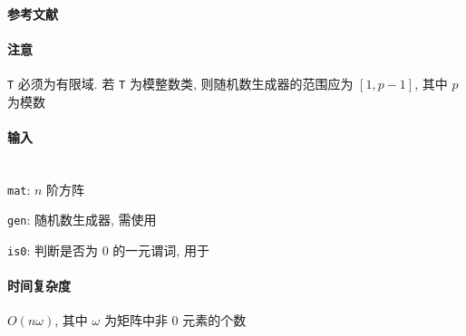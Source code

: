 \paragraph{参考文献} \cite{wiedemann1986solving}

\paragraph{注意} \verb|T| 必须为有限域. 若 \verb|T| 为模整数类, 则随机数生成器的范围应为 \([1, p-1]\), 其中 \(p\) 为模数

\paragraph{输入}~\\

\verb|mat|: \(n\) 阶方阵

\verb|gen|: 随机数生成器, 需使用 

\verb|is0|: 判断是否为 \(0\) 的一元谓词, 用于 

\paragraph{时间复杂度}

\(O(n\omega)\), 其中 \(\omega\) 为矩阵中非 \(0\) 元素的个数
